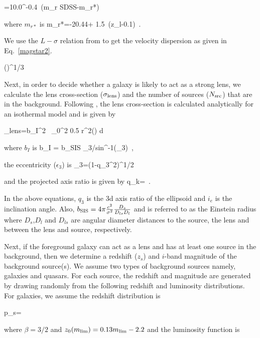 \documentclass[useAMS,usenatbib,a4paper]{mn2e}
\begin{document}
\be
{}=10.0^{-0.4~(m_{r \rm SDSS}-m_{r*})} 
\ee

where $m_{r*}$ is
\be
\label{magstar}
m_{r*}=-20.44+ 1.5~(z_{l}-0.1) \,.
\ee

We use the $L-\sigma$ relation from
\citep{Parker2007} to get the velocity dispersion as given in Eq.~\ref{magstar2}.

\be
\label{magstar2}
 \left(\right)^{1/3} 
\ee

Next, in order to decide whether a galaxy is likely to act as a strong lens, we
calculate the lens cross-section ($\sigma_{\rm lens}$) and the number of sources
($N_{\rm src}$) that are in the background. Following \citep{Keeton2000a}, the lens
cross-section is calculated analytically for an isothermal model and is given by 

\be
\sigma_{\rm lens}=b_I^2 \, \int_0^{2\pi} 0.5 r^2(\theta) d\theta
\ee

where $b_I$ is 
\be
b_I = b_{\rm SIS} \epsilon_3/sin^{-1}(\epsilon_3) \,,
\ee

the eccentricity ($\epsilon_3$) is 
\be
\epsilon_3=(1-q_3^2)^{1/2}
\ee

and the projected axis ratio is given by
\be
q_k= \,.
\ee

In the above equations, $q_3$ is the 3d axis ratio of the ellipsoid and $i_e$ is
the inclination angle. Also, $b_{\rm SIS}= 4\pi
\frac{c^2}{\sigma^2}\frac{D_{s}}{D_{ls}D_l}$ and is referred to as the
Einstein radius where $D_s$,$D_l$ and $D_{ls}$ are angular diameter distances to
the source, the lens and between the lens and source, respectively.


Next, if the foreground galaxy can act as a lens and has at least one source in the
background, then we determine a redshift ($z_s$) and $i$-band magnitude of the
background source(s). We assume two types of background sources namely, galaxies
and quasars. For each source, the redshift and magnitude are generated by drawing randomly from
the following redshift and luminosity distributions. For
galaxies, we assume the redshift distribution is 

\be
\label{eqn:ps}
p_s=
\ee

where $\beta=3/2$ and $z_0(m_{\rm lim})=0.13m_{\rm lim} - 2.2$ and the
luminosity function is
\end{document}
